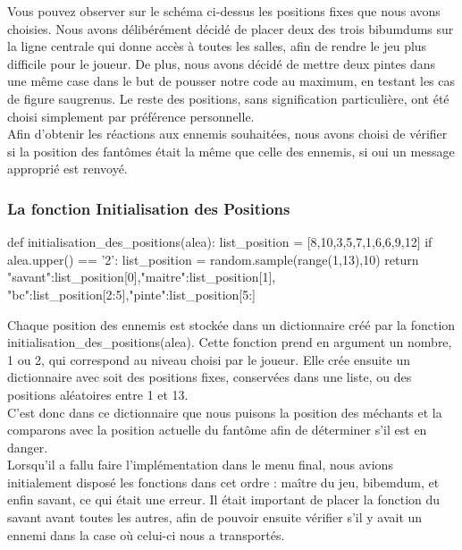 \documentclass[titlepage]{report}
\begin{document}
\hspace*{0.5cm}Vous pouvez observer sur le schéma ci-dessus les positions fixes que nous avons choisies. Nous avons délibérément décidé de placer deux des trois bibumdums sur la ligne centrale qui donne accès à toutes les salles, afin de rendre le jeu plus difficile pour le joueur. De plus, nous avons décidé de mettre deux pintes dans une même case dans le but de pousser notre code au maximum, en testant les cas de figure saugrenus. Le reste des positions, sans signification particulière, ont été choisi simplement par préférence personnelle. \\
Afin d'obtenir les réactions aux ennemis souhaitées, nous avons choisi de vérifier si la position des fantômes était la même que celle des ennemis, si oui un message approprié est renvoyé.\\
\subsubsection{La fonction Initialisation des Positions}
\begin{python}
def initialisation_des_positions(alea):
    list_position = [8,10,3,5,7,1,6,6,9,12]
    if alea.upper() == '2':
        list_position = random.sample(range(1,13),10)
    return {"savant":list_position[0],"maitre":list_position[1],
    "bc":list_position[2:5],"pinte":list_position[5:]}
\end{python}
\vspace*{0.5cm}
\hspace*{0.5cm} Chaque position des ennemis est stockée dans un dictionnaire créé par la fonction initialisation\_des\_positions(alea). Cette fonction prend en argument un nombre, 1 ou 2, qui correspond au niveau choisi par le joueur. Elle crée ensuite un dictionnaire avec soit des positions fixes, conservées dans une liste, ou des positions aléatoires entre 1 et 13.\\
\hspace*{0.5cm}C'est donc dans ce dictionnaire que nous puisons la position des méchants et la comparons avec la position actuelle du fantôme afin de déterminer s'il est en danger.\\
\hspace*{0.5cm}Lorsqu'il a fallu faire l'implémentation dans le menu final, nous avions initialement disposé les fonctions dans cet ordre : maître du jeu, bibemdum, et enfin savant, ce qui était une erreur. Il était important de placer la fonction du savant avant toutes les autres, afin de pouvoir ensuite vérifier s'il y avait un ennemi dans la case où celui-ci nous a transportés.\\ 
\end{document}
